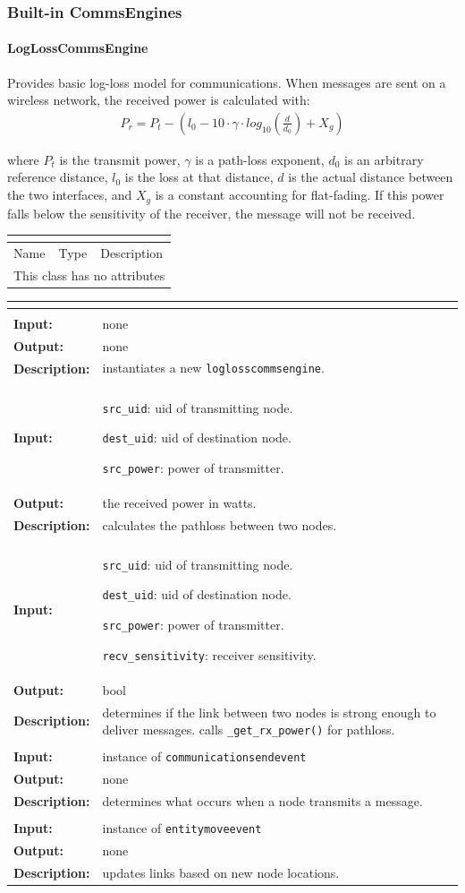 \documentclass[titlepage]{article}
\renewenvironment{itemize*}
    {\begin{itemize}
        \setlength{\itemsep}{0pt}%
        \setlength{\parskip}{0pt}%
        \setlength{\partopsep}{0pt}%
        \setlength{\topsep}{0pt}}%
    {\end{itemize}}
\newcommand{\operations}[1]{
\begin{center}
    \begin{longtable}{|p{4cm}|p{10cm + 2.0\tabcolsep}|}
    \hline
    \multicolumn{2}{|l|}{\cellcolor[gray]{0.5}{\textbf{Operations}}} \\ \hline
#1
    \end{longtable}
\end{center}
}
\newcommand{\operation}[4]{
    \hline
    \multicolumn{2}{|l|}{\cellcolor[gray]{0.8}{\texttt{#1}}} \\ \hline
    \hspace{7pt}\textbf{Input:} & #2 \\ \hline
    \hspace{7pt}\textbf{Output:} & #3 \\ \hline
    \hspace{7pt}\textbf{Description:} & #4 \\ \hline
}
\newcommand{\noattributes}{
    \begin{center}
        \begin{tabular}{|p{3cm}|p{3cm}|p{8cm}|}
            \multicolumn{3}{|l|}{\cellcolor[gray]{0.5}{\textbf{Attributes}}} \\ \hline
            \rowcolor[gray]{0.8} Name & Type & Description \\ \hline 
            \multicolumn{3}{|c|}{This class has no attributes} \\ \hline
        \end{tabular}
    \end{center}
}
\begin{document}
\subsubsection{Built-in CommsEngines}
\paragraph{LogLossCommsEngine}{Provides basic log-loss model for communications.  When messages are sent on a wireless network, the received power is calculated with:
\label{sec:logloss}
\begin{align*}
    P_r = P_t - \left(l_0 - 10 \cdot \gamma \cdot log_{10}\left(\frac{d}{d_0}\right) + X_g\right)
\end{align*}

where $P_t$ is the transmit power, $\gamma$ is a path-loss exponent, $d_0$ is an arbitrary reference distance, $l_0$ is the loss at that distance, $d$ is the actual distance between the two interfaces, and $X_g$ is a constant accounting for flat-fading.  If this power falls below the sensitivity of the receiver, the message will not be received.}

\noattributes

\operations
{
    \operation{\_\_init\_\_()}{none}{none}{instantiates a new \texttt{loglosscommsengine}.}
    \operation{\_get\_rx\_power(src\_uid, dest\_uid, src\_power}{
        \begin{itemize*}
            \item \texttt{src\_uid}: uid of transmitting node.
            \item \texttt{dest\_uid}: uid of destination node.
            \item \texttt{src\_power}: power of transmitter.
        \end{itemize*}}{the received power in watts.}{calculates the pathloss between two nodes.}
    \operation{\_should\_deliver(src\_uid, dest\_uid, src\_power, recv\_sensitivity)}{
        \begin{itemize*}
            \item \texttt{src\_uid}: uid of transmitting node.
            \item \texttt{dest\_uid}: uid of destination node.
            \item \texttt{src\_power}: power of transmitter.
            \item \texttt{recv\_sensitivity}: receiver sensitivity.
        \end{itemize*}}{bool}{determines if the link between two nodes is strong enough to deliver messages.  calls \texttt{\_get\_rx\_power()} for pathloss.}
    \operation{\_on\_send(event)}{instance of \texttt{communicationsendevent}}{none}{determines what occurs when a node transmits a message.}
    \operation{\_on\_movement(event)}{instance of \texttt{entitymoveevent}}{none}{updates links based on new node locations.}
}
\end{document}
